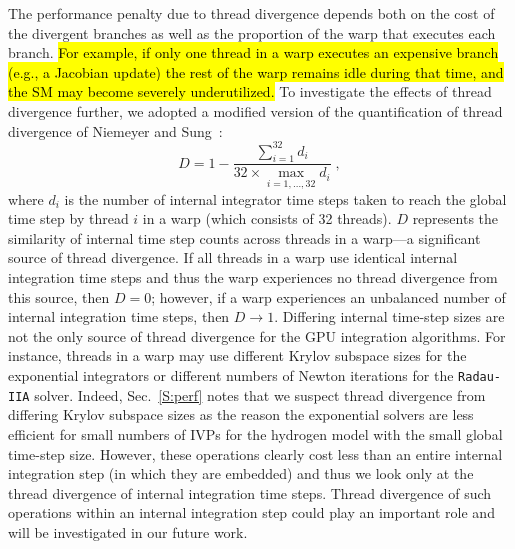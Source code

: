 \documentclass[preprint,review,11pt]{elsarticle}
\DeclareRobustCommand{\hlg}[1]{\sethlcolor{green}\hl{#1}}
\begin{document}
The performance penalty due to thread divergence depends both on the cost of the divergent branches as well as the proportion of the warp that executes each branch.
\hlg{For example, if only one thread in a warp executes an expensive branch (e.g., a Jacobian update) the rest of the warp remains idle during that time, and the SM may become severely underutilized.}
To investigate the effects of thread divergence further, we adopted a modified version of the quantification of thread divergence of Niemeyer and Sung~\cite{Niemeyer:2014aa}:
\begin{equation}
	D = 1 - \frac{\sum_{i=1}^{32}{d_i}}{32 \times \max\limits_{i = 1, \dots, 32} d_i} \;,
	\label{eqn:divergence}
\end{equation}
where $d_i$ is the number of internal integrator time steps taken to reach the global time step by thread $i$ in a warp (which consists of 32 threads).
$D$ represents the similarity of internal time step counts across threads in a warp---a significant source of thread divergence.
If all threads in a warp use identical internal integration time steps and thus the warp experiences no thread divergence from this source, then $D = 0$; however, if a warp experiences an unbalanced number of internal integration time steps, then $D \to 1$.
Differing internal time-step sizes are not the only source of thread divergence for the GPU integration algorithms.
For instance, threads in a warp may use different Krylov subspace sizes for the exponential integrators or different numbers of Newton iterations for the \texttt{Radau-IIA} solver.
Indeed, Sec.~\ref{S:perf} notes that we suspect thread divergence from differing Krylov subspace sizes as the reason the exponential solvers are less efficient for small numbers of IVPs for the hydrogen model with the small global time-step size.
However, these operations clearly cost less than an entire internal integration step (in which they are embedded) and thus we look only at the thread divergence of internal integration time steps.
Thread divergence of such operations within an internal integration step could play an important role and will be investigated in our future work.
\end{document}

